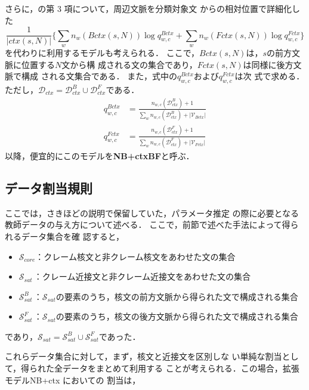 \documentclass[japanese]{jnlp_1.4}
\def\eq#1{}
\begin{document}
さらに，\eq{eqex}の第 3 項について，周辺文脈を分類対象文
からの相対位置で詳細化した
\begin{equation}
  \frac{1}{|ctx(s,N)|} \big\{ \sum_{w}n_{w}(Bctx(s,N))\log q^{Bctx}_{w,c} 
	+ \sum_{w}n_{w}(Fctx(s,N))\log q^{Fctx}_{w,c} \big\}
\label{eq:eqex2}
\end{equation}
を代わりに利用するモデルも考えられる．
ここで，$Bctx(s,N)$は，$s$の前方文脈に位置する$N$文から構
成される文の集合であり，$Fctx(s,N)$は同様に後方文脈で構成
される文集合である．
また，式中の$q^{Bctx}_{w,c}$および$q^{Fctx}_{w,c}$は次
式で求める．ただし，$\mathcal{D}_{ctx} =
\mathcal{D}^{B}_{ctx} \cup \mathcal{D}^{F}_{ctx}$である．
\begin{align}
q^{Bctx}_{w,c} & = \frac{\displaystyle n_{w,c}(\mathcal{D}^{B}_{ctx})+1}{\displaystyle \sum_{w}n_{w,c}(\mathcal{D}^{B}_{ctx})+|\mathcal{V}_{Bctx}|}\\
q^{Fctx}_{w,c} & = \frac{\displaystyle n_{w,c}(\mathcal{D}^{F}_{ctx})+1}{\displaystyle \sum_{w}n_{w,c}(\mathcal{D}^{F}_{ctx})+|\mathcal{V}_{Fctx}|}
\end{align}
以降，便宜的にこのモデルを\textbf{NB+ctxBF}と呼ぶ．



\subsection{データ割当規則}
\label{sec:wariate}

ここでは，さきほどの説明で保留していた，パラメータ推定
の際に必要となる教師データの与え方について述べる．
ここで，前節で述べた手法によって得られるデータ集合を確
認すると，

\begin{itemize}
 \item $\mathcal{S}_{core}$：クレーム核文と非クレーム核文をあわせた文の集合
 \item $\mathcal{S}_{sat~}$：クレーム近接文と非クレーム近接文をあわせた文の集合
 \item $\mathcal{S}^{B}_{sat~}$：$\mathcal{S}_{sat}$の要素のうち，核文の前方文脈から得られた文で構成される集合
 \item $\mathcal{S}^{F}_{sat~}$：$\mathcal{S}_{sat}$の要素のうち，核文の後方文脈から得られた文で構成される集合
\end{itemize}

であり，$\mathcal{S}_{sat} = \mathcal{S}_{sat}^{B} \cup \mathcal{S}_{sat}^{F}$であった．

これらデータ集合に対して，まず，核文と近接文を区別しな
い単純な割当として，得られた全データをまとめて利用する
ことが考えられる．この場合，拡張モデルNB+ctx においての
割当は，
\end{document}
